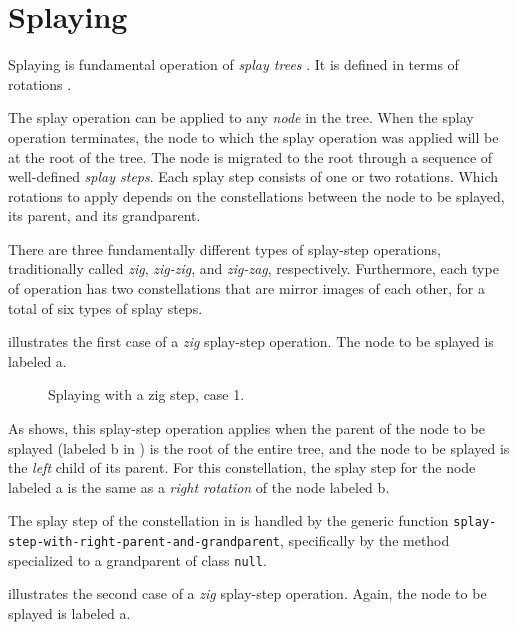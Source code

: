 \section{Splaying}
\label{sec-splaying}

Splaying is fundamental operation of \emph{splay trees}
\cite{Sleator:1985:SBS:3828.3835}.  It is defined in terms of
rotations .

The splay operation can be applied to any \emph{node} in the tree.
When the splay operation terminates, the node to which the splay
operation was applied will be at the root of the tree.  The node is
migrated to the root through a sequence of well-defined \emph{splay
  steps}.  Each splay step consists of one or two rotations.  Which
rotations to apply depends on the constellations between the node to
be splayed, its parent, and its grandparent.

There are three fundamentally different types of splay-step
operations, traditionally called \emph{zig}, \emph{zig-zig}, and
\emph{zig-zag}, respectively.  Furthermore, each type of operation has
two constellations that are mirror images of each other, for a total
of six types of splay steps.

 illustrates the first case of a \emph{zig}
splay-step operation.  The node to be splayed is labeled \textsf{a}.

\begin{figure}
\begin{center}
\end{center}
\caption{\label{fig-splay-zig-1}
Splaying with a zig step, case 1.}
\end{figure}

As  shows, this splay-step operation applies
when the parent of the node to be splayed (labeled \textsf{b} in
) is the root of the entire tree, and the node
to be splayed is the \emph{left} child of its parent.  For this
constellation, the splay step for the node labeled \textsf{a} is the
same as a \emph{right rotation} of the node labeled \textsf{b}.

The splay step of the constellation in  is
handled by the generic function
\texttt{splay-step-with-right-parent-and-grandparent}, specifically by
the method specialized to a grandparent of class \texttt{null}.

 illustrates the second case of a \emph{zig}
splay-step operation.  Again, the node to be splayed is labeled
\textsf{a}.

